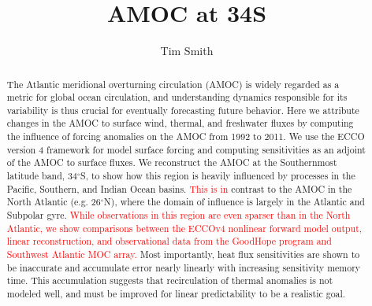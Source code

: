 \documentclass[a4paper,11pt]{article}
\title{\vspace{-10ex}AMOC at 34S}
\author{Tim Smith}
\date{\vspace{-3ex}}
\newcommand{\red}[1]{\textcolor{red}{#1}}
\begin{document}
\maketitle

\begin{abstract}

  The Atlantic meridional overturning circulation (AMOC) is widely regarded as a metric for global ocean circulation, and understanding dynamics responsible for its variability is thus crucial for eventually forecasting future behavior. Here we attribute changes in the AMOC to surface wind, thermal, and freshwater fluxes by computing the influence of forcing anomalies on the AMOC from 1992 to 2011. We use the ECCO version 4 framework for model surface forcing and computing sensitivities as an adjoint of the AMOC to surface fluxes. We reconstruct the AMOC at the Southernmost latitude band, 34$^{\circ}$S, to show how this region is heavily influenced by processes in the Pacific, Southern, and Indian Ocean basins. \red{This is in} contrast to the AMOC in the North Atlantic (e.g. 26$^{\circ}$N), where the domain of influence is largely in the Atlantic and Subpolar gyre. \red{While observations in this region are even sparser than in the North Atlantic, we show comparisons between the ECCOv4 nonlinear forward model output, linear reconstruction, and observational data from the GoodHope program and Southwest Atlantic MOC array.} Most importantly, heat flux sensitivities are shown to be inaccurate and accumulate error nearly linearly with increasing sensitivity memory time. This accumulation suggests that recirculation of thermal anomalies is not modeled well, and must be improved for linear predictability to be a realistic goal.    
  

\end{abstract}
\end{document}
